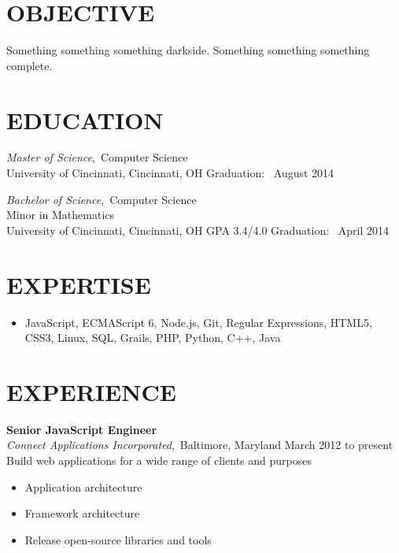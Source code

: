 \documentclass[11pt, line]{res}
\begin{document}
	\address{8228 Melrose Ln\\ Maineville, OH 45039\\ 513-259-0656\\ ross@rhadden.com}

	\begin{resume}
		\section{OBJECTIVE}
			Something something something darkside.  Something something something complete.

		\section{EDUCATION}
				\textit{Master of Science},\, Computer Science \\
				University of Cincinnati, Cincinnati, OH
				\hfill
				Graduation: \ August 2014

				\textit{Bachelor of Science},\, Computer Science \\
				Minor in Mathematics \\
				University of Cincinnati, Cincinnati, OH
				\hspace{16pt}
				GPA 3.4/4.0
				\hfill
				Graduation: \ April 2014

		\section{EXPERTISE}
			\begin{itemize}[leftmargin=0pt]
				\item[]
					JavaScript,
					ECMAScript 6,
					Node.js,
					Git,
					Regular Expressions,
					HTML5,
					CSS3,
					Linux,
					SQL,
					Grails,
					PHP,
					Python,
					C++,
					Java
			\end{itemize}

		\section{EXPERIENCE}
				\textbf{Senior JavaScript Engineer} \\
				\textit{Connect Applications Incorporated},\, Baltimore, Maryland
					\hfill March 2012 to present \\
				Build web applications for a wide range of clients and purposes

				\begin{itemize}
					\item Application architecture
					\item Framework architecture
					\item Release open-source libraries and tools
				\end{itemize}


\end{resume}
\end{document}
